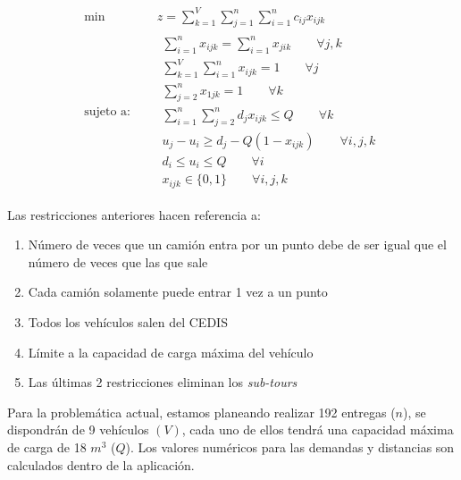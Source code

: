 \documentclass[journal]{IEEEtran}
\begin{document}
        \begin{equation*}
            \begin{aligned}
                \text{min } \quad & z = \sum_{k=1}^{V} \sum_{j=1}^{n} \sum_{i=1}^{n} c_{ij} x_{ijk}\\
                \text{sujeto a: }\quad &
                \begin{array}{c}
                    \displaystyle\sum_{i=1}^{n} x_{ijk} = \sum_{i=1}^{n} x_{jik} \qquad \forall j, k \\[3pt]
                    \displaystyle\sum_{k=1}^{V} \sum_{i=1}^{n} x_{ijk} = 1 \qquad \forall j \\[3pt]
                    \displaystyle\sum_{j=2}^{n} x_{1jk} = 1 \qquad \forall k \\[3pt]
                    \displaystyle\sum_{i=1}^{n} \sum_{j=2}^{n} d_{j} x_{ijk} \leq Q \qquad \forall k\\[3pt]
                    u_{j} - u_{i} \geq d_j - Q (1 - x_{ijk}) \qquad \forall i, j, k\\[3pt]
                    d_i \leq u_i \leq Q \qquad \forall i \\[3pt]
                    x_{ijk} \in \{0, 1\} \qquad \forall i, j, k
                \end{array}
            \end{aligned}
        \end{equation*}
        
        Las restricciones anteriores hacen referencia a:
        \begin{enumerate}
            \item Número de veces que un camión entra por un punto debe de ser igual que el número de veces que las que sale
            \item Cada camión solamente puede entrar 1 vez a un punto
            \item Todos los vehículos salen del CEDIS
            \item Límite a la capacidad de carga máxima del vehículo
            \item Las últimas 2 restricciones eliminan los \emph{sub-tours}
        \end{enumerate}
        
        Para la problemática actual, estamos planeando realizar 192 entregas ($n$), se dispondrán de 9 vehículos $(V)$, cada uno de ellos tendrá una capacidad máxima de carga de 18 $m^3$ ($Q$). Los valores numéricos para las demandas y distancias son calculados dentro de la aplicación.
        
\end{document}
